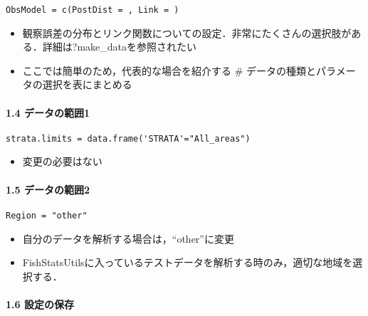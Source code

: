 \documentclass[]{article}
\providecommand{\tightlist}{%
  \setlength{\itemsep}{0pt}\setlength{\parskip}{0pt}}
\let\oldparagraph\paragraph
\renewcommand{\paragraph}[1]{\oldparagraph{#1}\mbox{}}
\begin{document}
\begin{verbatim}
ObsModel = c(PostDist = , Link = )
\end{verbatim}

\begin{itemize}
\tightlist
\item
  観察誤差の分布とリンク関数についての設定．非常にたくさんの選択肢がある．詳細は?make\_dataを参照されたい
\item
  ここでは簡単のため，代表的な場合を紹介する \#
  データの種類とパラメータの選択を表にまとめる 
\end{itemize}

\hypertarget{ux30c7ux30fcux30bfux306eux7bc4ux56f21}{%
\paragraph{1.4
データの範囲1}\label{ux30c7ux30fcux30bfux306eux7bc4ux56f21}}

\begin{verbatim}
strata.limits = data.frame('STRATA'="All_areas")
\end{verbatim}

\begin{itemize}
\tightlist
\item
  変更の必要はない 
\end{itemize}

\hypertarget{ux30c7ux30fcux30bfux306eux7bc4ux56f22}{%
\paragraph{1.5
データの範囲2}\label{ux30c7ux30fcux30bfux306eux7bc4ux56f22}}

\begin{verbatim}
Region = "other"
\end{verbatim}

\begin{itemize}
\tightlist
\item
  自分のデータを解析する場合は，``other''に変更
\item
  FishStatsUtilsに入っているテストデータを解析する時のみ，適切な地域を選択する．
\end{itemize}

\hypertarget{ux8a2dux5b9aux306eux4fddux5b58}{%
\paragraph{1.6 設定の保存}\label{ux8a2dux5b9aux306eux4fddux5b58}}
\end{document}
